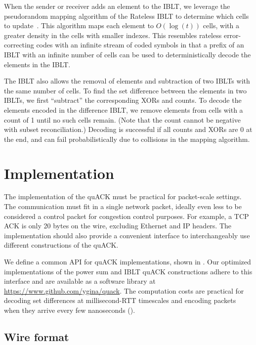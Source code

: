 When the sender or receiver adds an element to the IBLT, we leverage the
pseudorandom mapping algorithm of the Rateless IBLT to determine which cells
to update~\cite{yang2024practical}. This algorithm maps each element to
$O(\log(t))$ cells, with a greater density in the cells with smaller indexes.
This resembles rateless error-correcting codes with an infinite stream of coded
symbols in that a prefix of an IBLT with an infinite number of cells can be
used to deterministically decode the elements in the IBLT.

The IBLT also allows the removal of elements and subtraction of two IBLTs with
the same number of cells. To find the set difference between the elements in
two IBLTs, we first ``subtract'' the corresponding XORs and counts. To decode
the elements encoded in the difference IBLT, we remove elements from cells with
a count of 1 until no such cells remain. (Note that the count cannot be
negative with subset reconciliation.) Decoding is successful if all counts
and XORs are 0 at the end, and can fail probabilistically due to collisions in
the mapping algorithm.

\section{Implementation}
\label{sec:quack:implementation}

The implementation of the quACK must be practical for packet-scale settings. The
communication must fit in a single network packet, ideally even less to be
considered a control packet for congestion control purposes. For example, a TCP
ACK is only 20 bytes on the wire, excluding Ethernet and IP headers.
The implementation should also provide a convenient interface to
interchangeably use different constructions of the quACK.

We define a common API for quACK implementations, shown in
. Our optimized implementations of the power sum and
IBLT quACK constructions adhere to this interface and are available as a
software library at \url{https://www.github.com/ygina/quack}.
The computation costs are practical for decoding set differences at
millisecond-RTT timescales and encoding packets when they arrive every few
nanoseconds ().

\subsection{Wire format}

